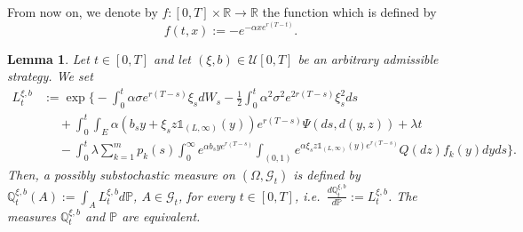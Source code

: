 \documentclass[reqno, 11pt]{amsart}%
\newcommand{\R}{\mathbb{R}}
\newcommand{\Pop}{\mathbb{P}}
\newcommand{\Q}{\mathbb{Q}}
\newtheorem{lemma}[theorem]{Lemma}
\theoremstyle{definition}
\numberwithin{equation}{section} \numberwithin{theorem}{section}
\begin{document}
From now on, we denote by $f:[0,T]\times\R\to\R$ the function which is defined by
\begin{equation}\label{f}
f(t,x) := -e^{-\alpha x e^{r(T-t)}}.
\end{equation}

\begin{lemma}\label{Qxibt}
   Let $t\in[0,T]$ and let $(\xi,b)\in\mathcal{U}[0,T]$ be an arbitrary admissible strategy. We set
   \begin{equation}\label{density}
   \begin{aligned}
L^{\xi,b}_t &:= \exp\bigg\{ -\int_0^t \alpha\sigma e^{r(T-s)}\xi_s dW_s -\frac12 \int_0^t \alpha^2\sigma^2e^{2r(T-s)}\xi_s^2 ds \\
&\;\quad+\int_0^t\int_E \alpha(b_s y + \xi_s z \mathds{1}_{(L,\infty)}(y)) e^{r(T-s)}\Psi(ds, d(y,z)) + \lambda t \\
&\;\quad -\int_0^t\lambda \sum_{k=1}^m p_k(s) \int_0^\infty e^{\alpha b_s y e^{r(T-s)}}\int_{(0,1)} e^{\alpha \xi_s z\mathds{1}_{(L,\infty)}(y) e^{r(T-s)}}Q(dz)f_k(y)dy ds\bigg\}.
\end{aligned}
\end{equation}
   Then, a possibly substochastic  measure on $(\Omega,\mathcal{G}_t)$ is defined by $\Q^{\xi,b}_t(A):=\int_A L^{\xi,b}_t d\Pop$, $A\in\mathcal{G}_t$, for every $t\in[0,T]$, i.e.\ $\frac{d\Q^{\xi,b}_t}{d\Pop}:=L^{\xi,b}_t$. The  measures $\Q^{\xi,b}_t$ and $\Pop$ are equivalent.
\end{lemma}
\end{document}
